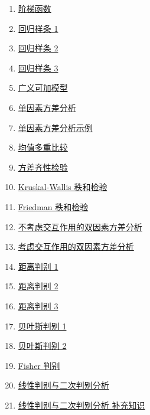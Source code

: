 \documentclass[11pt]{article}
\begin{document}
\begin{multicols}{2}
\begin{enumerate}
		\item \href{https://mp.weixin.qq.com/s/ZIyemFRmiQp0082GuqBWpQ}{阶梯函数}	%
		\item \href{https://mp.weixin.qq.com/s/odznN76y2DOw6o1i3m0SLA}{回归样条 1}	%
		\item \href{https://mp.weixin.qq.com/s/lHG9V4lBvqHejyO_2M8JHQ}{回归样条 2}	%
		\item \href{https://mp.weixin.qq.com/s/ScrbVXlJx_2ZyjZaAgWcdA}{回归样条 3}	%
		\item \href{https://mp.weixin.qq.com/s/5mfkm7NnsrtQGI3AChKpkA}{广义可加模型}	%
		\item \href{https://mp.weixin.qq.com/s/yBDbrbFil-qyoJtzGgCY2g}{单因素方差分析}	%
		\item \href{https://mp.weixin.qq.com/s/tAPOSiLiACp7NSewzy4Zig}{单因素方差分析示例}	%
		\item \href{https://mp.weixin.qq.com/s/zAwolLEmLZPL4uT7huHfPg}{均值多重比较}	%
		\item \href{https://mp.weixin.qq.com/s/oza2CZDb_T0oW1eLJpOzpA}{方差齐性检验}	%
		\item \href{https://mp.weixin.qq.com/s/UF6BhdWP01FKVdHGPl99tA}{Kruskal-Wallis 秩和检验}	%
		\item \href{https://mp.weixin.qq.com/s/MJ1afMwgKPEnSalm-qeHOA}{Friedman 秩和检验}	%
		\item \href{https://mp.weixin.qq.com/s/ttl-M_868gIk70q4Rm6j8Q}{不考虑交互作用的双因素方差分析}	%
		\item \href{https://mp.weixin.qq.com/s/ByA7Tgw7tO3D9JfddF30eQ}{考虑交互作用的双因素方差分析}	%
		\item \href{https://mp.weixin.qq.com/s/1JhSW9HhSa2m-roSuBMnkQ}{距离判别 1}	%
		\item \href{https://mp.weixin.qq.com/s/odiOILH-2A0aXNEkNyB6JQ}{距离判别 2}	%
		\item \href{https://mp.weixin.qq.com/s/A5rGs7IM_swTmYIul80I1A}{距离判别 3}	%
		\item \href{https://mp.weixin.qq.com/s/eBXdCBwgXBcszxBSE4EePw}{贝叶斯判别 1}	%
		\item \href{https://mp.weixin.qq.com/s/6x2nQjUNKETcjOgswKvkwQ}{贝叶斯判别 2}	%
		\item \href{https://mp.weixin.qq.com/s/YAH11ctWCIrgSgMnIK0v8w}{Fisher 判别}	%
		\item \href{https://mp.weixin.qq.com/s/y_5qnIUQeVeBwe3dsLC8tQ}{线性判别与二次判别分析}	%
		\item \href{https://mp.weixin.qq.com/s/CmXzgGQzX-dnKsp7_F9-YQ}{线性判别与二次判别分析 补充知识}	%

\end{enumerate}
\end{multicols}
\end{document}
